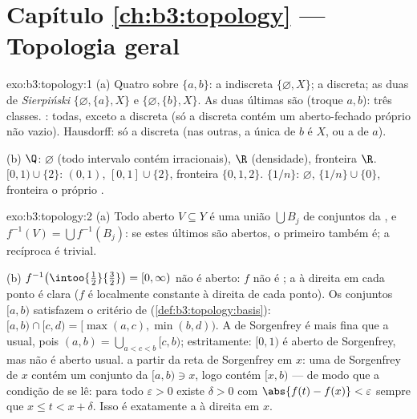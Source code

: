 \section*{Capítulo \ref{ch:b3:topology} --- Topologia geral}

\begin{solution}{exo:b3:topology:1}
(a) Quatro  sobre $\{a,b\}$: a indiscreta
$\{\varnothing, X\}$; a discreta; as duas  de \emph{Sierpiński}
$\{\varnothing, \{a\}, X\}$ e $\{\varnothing,
\{b\}, X\}$. As duas últimas são  (troque $a, b$): três
classes. : todas, exceto a discreta (só a
 discreta contém um aberto-fechado próprio não vazio).
Hausdorff: só a discreta (nas outras, a única  de
$b$ é $X$, ou a de $a$).

(b) $\Q$:  $\varnothing$ (todo intervalo contém
irracionais),  $\R$ (densidade), fronteira $\R$. $[0,1)
\cup \{2\}$:  $(0,1)$,  $[0,1]\cup\{2\}$,
fronteira $\{0, 1, 2\}$. $\{1/n\}$:  $\varnothing$,
 $\{1/n\}\cup\{0\}$, fronteira o próprio .
\end{solution}

\begin{solution}{exo:b3:topology:2}
(a) Todo aberto $V \subseteq Y$ é uma união $\bigcup B_j$ de conjuntos
da , e $f^{-1}(V) = \bigcup f^{-1}(B_j)$: se estes últimos são
abertos, o primeiro também é; a recíproca é trivial.

(b) $f^{-1}\bigl(\intoo{\frac12}{\frac32}\bigr) = [0, \infty)$
não é aberto: $f$ não é ; a  à direita em cada
ponto é clara ($f$ é localmente constante à direita de cada
ponto). Os conjuntos $[a, b)$ satisfazem o critério de 
(\cref{def:b3:topology:basis}): $[a,b)\cap[c,d) = [\max(a,c),
\min(b,d))$. A  de Sorgenfrey é mais fina que a
usual, pois $(a, b) = \bigcup_{a < c < b}[c, b)$; estritamente:
$[0,1)$ é aberto de Sorgenfrey, mas não é aberto usual.  a partir da
reta de Sorgenfrey em $x$: uma  de Sorgenfrey de $x$
contém um conjunto da  $[a, b) \ni x$, logo contém $[x, b)$ ---
de modo que a condição de  se lê: para todo $\varepsilon > 0$
existe $\delta > 0$ com $\abs{f(t) - f(x)} < \varepsilon$
sempre que $x \leq t < x + \delta$. Isso é exatamente a
 à direita em $x$.
\end{solution}


